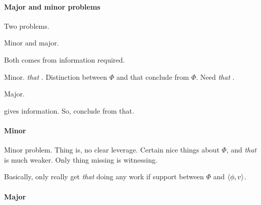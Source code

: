 \paragraph*{Major and minor problems}

\begin{note}
  Two problems.

  Minor and major.

  Both comes from information required.

  Minor.
  \emph{that} .
  Distinction between \(\Phi\) and that conclude from \(\Phi\).
  Need \emph{that} .

  Major.

  \itp{} gives information.
  So, conclude from that.
\end{note}

\paragraph*{Minor}

\begin{note}[Minor]
  Minor problem.
  Thing is, no clear leverage.
  Certain nice things about \(\Phi\), and \emph{that}  is much weaker.
  Only thing missing is witnessing.

  Basically, only really get \emph{that}  doing any work if support between \(\Phi\) and \(\langle \phi, v \rangle\).
\end{note}

\paragraph*{Major}

